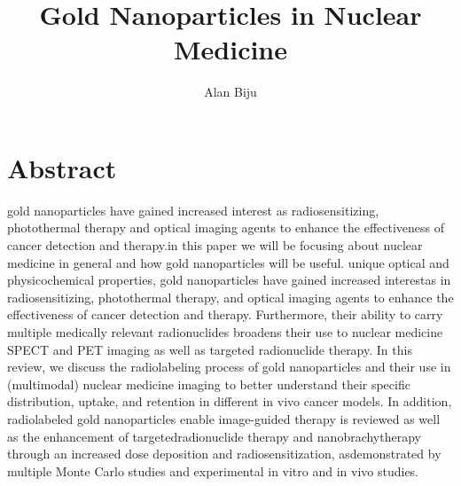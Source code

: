 \documentclass{article}
\begin{document}
\title{Gold Nanoparticles in Nuclear Medicine }
\author{Alan Biju}


\maketitle


\section*{Abstract}

gold nanoparticles have gained increased interest as radiosensitizing, photothermal therapy and optical imaging agents to enhance the effectiveness of cancer detection and therapy.in this paper we will be focusing about nuclear medicine in general and how gold nanoparticles will be useful. unique optical and physicochemical properties, gold nanoparticles have gained increased interestas in radiosensitizing, photothermal therapy, and optical imaging agents to enhance the effectiveness of cancer detection and therapy. Furthermore, their ability to carry multiple medically relevant radionuclides broadens their use to nuclear medicine SPECT and PET imaging as well as targeted radionuclide therapy. In this review, we discuss the radiolabeling process of gold nanoparticles and their use in (multimodal) nuclear medicine imaging to better understand their specific distribution, uptake, and retention in different in vivo cancer models. In addition,
radiolabeled gold nanoparticles enable image-guided therapy is reviewed as well as the enhancement of targetedradionuclide therapy and nanobrachytherapy through an increased dose deposition and radiosensitization, asdemonstrated by multiple Monte Carlo studies and experimental in vitro and in vivo studies.
\end{document}
